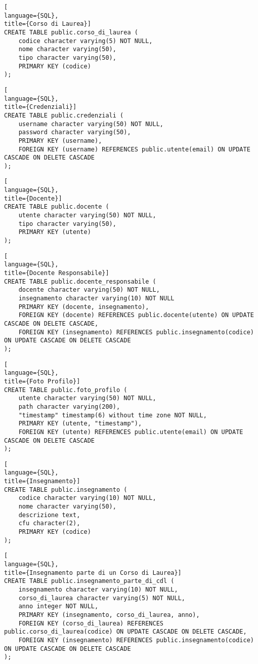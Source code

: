\documentclass{article}
\begin{document}
\begin{lstlisting}[
language={SQL},
title={Corso di Laurea}]
CREATE TABLE public.corso_di_laurea (
    codice character varying(5) NOT NULL,
    nome character varying(50),
    tipo character varying(50),
    PRIMARY KEY (codice)
);
\end{lstlisting}

\begin{lstlisting}[
language={SQL},
title={Credenziali}]
CREATE TABLE public.credenziali (
    username character varying(50) NOT NULL,
    password character varying(50),
    PRIMARY KEY (username),
    FOREIGN KEY (username) REFERENCES public.utente(email) ON UPDATE CASCADE ON DELETE CASCADE
);
\end{lstlisting}

\begin{lstlisting}[
language={SQL},
title={Docente}]
CREATE TABLE public.docente (
    utente character varying(50) NOT NULL,
    tipo character varying(50),
    PRIMARY KEY (utente)
);
\end{lstlisting}

\begin{lstlisting}[
language={SQL},
title={Docente Responsabile}]
CREATE TABLE public.docente_responsabile (
    docente character varying(50) NOT NULL,
    insegnamento character varying(10) NOT NULL
    PRIMARY KEY (docente, insegnamento),
    FOREIGN KEY (docente) REFERENCES public.docente(utente) ON UPDATE CASCADE ON DELETE CASCADE,
    FOREIGN KEY (insegnamento) REFERENCES public.insegnamento(codice) ON UPDATE CASCADE ON DELETE CASCADE
);
\end{lstlisting}

\begin{lstlisting}[
language={SQL},
title={Foto Profilo}]
CREATE TABLE public.foto_profilo (
    utente character varying(50) NOT NULL,
    path character varying(200),
    "timestamp" timestamp(6) without time zone NOT NULL,
    PRIMARY KEY (utente, "timestamp"),
    FOREIGN KEY (utente) REFERENCES public.utente(email) ON UPDATE CASCADE ON DELETE CASCADE
);
\end{lstlisting}

\begin{lstlisting}[
language={SQL},
title={Insegnamento}]
CREATE TABLE public.insegnamento (
    codice character varying(10) NOT NULL,
    nome character varying(50),
    descrizione text,
    cfu character(2),
    PRIMARY KEY (codice)
);
\end{lstlisting}

\begin{lstlisting}[
language={SQL},
title={Insegnamento parte di un Corso di Laurea}]
CREATE TABLE public.insegnamento_parte_di_cdl (
    insegnamento character varying(10) NOT NULL,
    corso_di_laurea character varying(5) NOT NULL,
    anno integer NOT NULL,
    PRIMARY KEY (insegnamento, corso_di_laurea, anno),
    FOREIGN KEY (corso_di_laurea) REFERENCES public.corso_di_laurea(codice) ON UPDATE CASCADE ON DELETE CASCADE,
    FOREIGN KEY (insegnamento) REFERENCES public.insegnamento(codice) ON UPDATE CASCADE ON DELETE CASCADE
);
\end{lstlisting}
\end{document}
